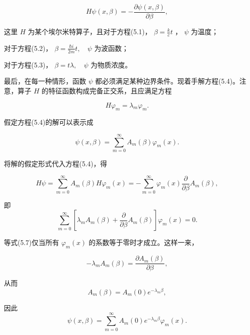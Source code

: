 \begin{equation*}
H \psi (x, \beta) = - \frac {\partial \psi (x , \beta)}{\partial \beta},\tag{5.4}
\end{equation*}

这里 $H$ 为某个埃尔米特算子，且对于方程(5.1)， $\beta = \frac{k}{c} t$ ， $\psi$ 为温度；

对于方程(5.2)， $\beta=\frac{\hbar i}{2m}t,\quad\psi$ 为波函数；

对于方程(5.3)， $\beta=t\lambda,\quad\psi$ 为物质浓度。

最后，在每一种情形，函数 $\psi$ 都必须满足某种边界条件。现着手解方程(5.4)。注意，算子 $H$ 的特征函数构成完备正交系，且应满足方程

\begin{equation*}
H \varphi_ {m} = \lambda_ {m} \varphi_ {m}.\tag{5.5}
\end{equation*}

假定方程(5.4)的解可以表示成

\begin{equation*}
\psi (x, \beta) = \sum_ {m = 0} ^ {\infty} A _ {m} (\beta) \varphi_ {m} (x).\tag{5.6}
\end{equation*}

将解的假定形式代入方程(5.4)，得

\begin{equation*}
H \psi = \sum_ {m = 0} ^ {\infty} A _ {m} (\beta) H \varphi_ {m} (x) = - \sum_ {m = 0} ^ {\infty} \varphi_ {m} (x) \frac {\partial}{\partial \beta} A _ {m} (\beta),
\end{equation*}

即
\begin{equation*}
\sum_ {m = 0} ^ {\infty} \left[ \lambda_ {m} A _ {m} (\beta) + \frac {\partial}{\partial \beta} A _ {m} (\beta) \right] \varphi_ {m} (x) = 0.\tag{5.7}
\end{equation*}

等式(5.7)仅当所有 $\varphi_{m}(x)$ 的系数等于零时才成立。这样一来，

\begin{equation*}
- \lambda_ {m} A _ {m} (\beta) = \frac {\partial A _ {m} (\beta)}{\partial \beta},
\end{equation*}

从而
\begin{equation*}
A _ {m} (\beta) = A _ {m} (0) e ^ {- \lambda_ {m} \beta},
\end{equation*}

因此
\begin{equation*}
\psi (x, \beta) = \sum_ {m = 0} ^ {\infty} A _ {m} (0) e ^ {- \lambda_ {m} \beta} \varphi_ {m} (x).
\end{equation*}

